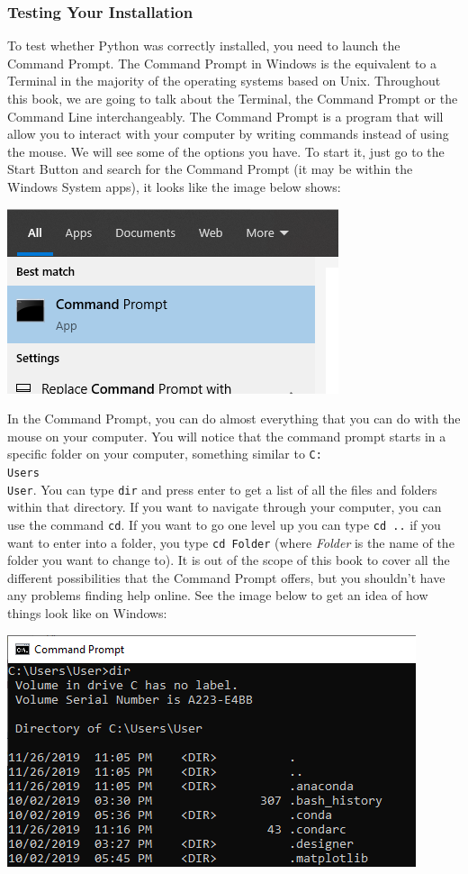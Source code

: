 \subsubsection{Testing Your Installation}
To test whether Python was correctly installed, you need to launch the Command Prompt. The Command Prompt in Windows is the equivalent to a Terminal in the majority of the operating systems based on Unix. Throughout this book, we are going to talk about the Terminal, the Command Prompt or the Command Line interchangeably. The Command Prompt is a program that will allow you to interact with your computer by writing commands instead of using the mouse. We will see some of the options you have. To start it, just go to the Start Button and search for the Command Prompt (it may be within the Windows System apps), it looks like the image below shows:

\begin{center}
\includegraphics[width=.5\textwidth]{images/Chapter_02/CommandPrompt.png}
\end{center}

In the Command Prompt, you can do almost everything that you can do with the mouse on your computer. You will notice that the command prompt starts in a specific folder on your computer, something similar to \texttt{C:\\Users\\User}. You can type \texttt{dir} and press enter to get a list of all the files and folders within that directory. If you want to navigate through your computer, you can use the command \texttt{cd}. If you want to go one level up you can type \texttt{cd ..} if you want to enter into a folder, you type \texttt{cd Folder} (where \textit{Folder} is the name of the folder you want to change to). It is out of the scope of this book to cover all the different possibilities that the Command Prompt offers, but you shouldn't have any problems finding help online. See the image below to get an idea of how things look like on Windows:

\begin{center}
\includegraphics[width=.5\textwidth]{images/Chapter_02/CommandPrompt03.png}
\end{center}

